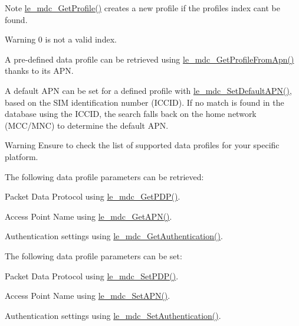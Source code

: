 \begin{DoxyNote}{Note}
\hyperlink{le__mdc__interface_8h_a638b693cd5f644fa5c24f81e1e36483c}{le\+\_\+mdc\+\_\+\+Get\+Profile()} creates a new profile if the profile\textquotesingle{}s index can\textquotesingle{}t be found.
\end{DoxyNote}
\begin{DoxyWarning}{Warning}
0 is not a valid index.
\end{DoxyWarning}
A pre-\/defined data profile can be retrieved using \hyperlink{le__mdc__interface_8h_a2ea0573e6e9cd16c04e95146f2b2e693}{le\+\_\+mdc\+\_\+\+Get\+Profile\+From\+Apn()} thanks to its A\+PN.

A default A\+PN can be set for a defined profile with \hyperlink{le__mdc__interface_8h_ad44bd756fd5cbfd43a5b348054786a4d}{le\+\_\+mdc\+\_\+\+Set\+Default\+A\+P\+N()}, based on the S\+IM identification number (I\+C\+C\+ID). If no match is found in the database using the I\+C\+C\+ID, the search falls back on the home network (M\+C\+C/\+M\+NC) to determine the default A\+PN.

\begin{DoxyWarning}{Warning}
Ensure to check the list of supported data profiles for your specific platform.
\end{DoxyWarning}
The following data profile parameters can be retrieved\+:
\begin{DoxyItemize}
\item Packet Data Protocol using \hyperlink{le__mdc__interface_8h_a0a51125579f1d5009dac03c79ddff498}{le\+\_\+mdc\+\_\+\+Get\+P\+D\+P()}.
\item Access Point Name using \hyperlink{le__mdc__interface_8h_afc0c149bfa4455f3e9a8ccc06f0c5fed}{le\+\_\+mdc\+\_\+\+Get\+A\+P\+N()}.
\item Authentication settings using \hyperlink{le__mdc__interface_8h_a3f83b1b922271091e3f1da418a4f39ca}{le\+\_\+mdc\+\_\+\+Get\+Authentication()}.
\end{DoxyItemize}

The following data profile parameters can be set\+:
\begin{DoxyItemize}
\item Packet Data Protocol using \hyperlink{le__mdc__interface_8h_a73e66a7a63dc95d7f261fc2a26470386}{le\+\_\+mdc\+\_\+\+Set\+P\+D\+P()}.
\item Access Point Name using \hyperlink{le__mdc__interface_8h_ae8ebd11b9cb9afb9b6b5745903f50156}{le\+\_\+mdc\+\_\+\+Set\+A\+P\+N()}.
\item Authentication settings using \hyperlink{le__mdc__interface_8h_a9f69d0751927b5ead6c756202179b222}{le\+\_\+mdc\+\_\+\+Set\+Authentication()}.
\end{DoxyItemize}

